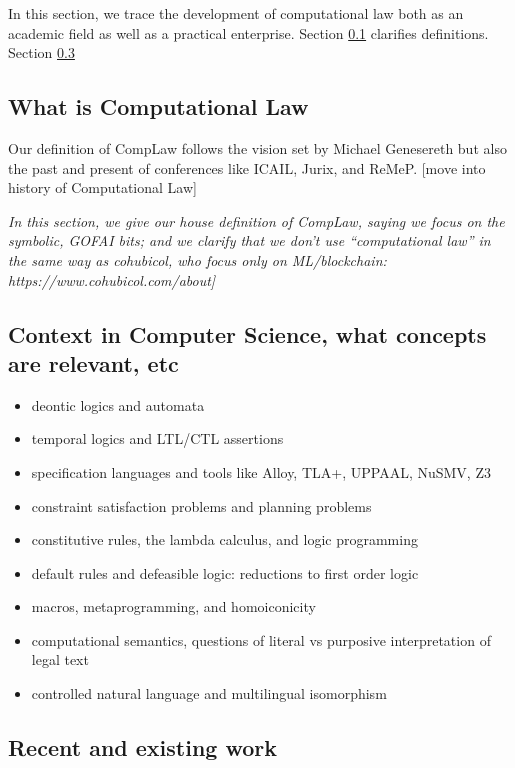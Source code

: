 \documentclass{IOS-Book-Article}
\begin{document}
In this section, we trace the development of computational law both as an academic field as well as a practical enterprise. Section \ref{sec:what_is} clarifies definitions. Section \ref{}
    
\subsection{What is Computational Law}
\label{sec:what_is}

Our definition of CompLaw follows the vision set by Michael Genesereth but also the past and present of conferences like ICAIL, Jurix, and ReMeP. [move into history of Computational Law]

\textit{In this section, we give our house definition of CompLaw, saying we focus on the symbolic, GOFAI bits; and we clarify that we don't use ``computational law'' in the same way as cohubicol, who focus only on ML/blockchain: https://www.cohubicol.com/about]}

\subsection{Context in Computer Science, what concepts are relevant, etc}

\begin{itemize}
    \item deontic logics and automata
    \item temporal logics and LTL/CTL assertions
    \item specification languages and tools like Alloy, TLA+, UPPAAL, NuSMV, Z3
    \item constraint satisfaction problems and planning problems
    \item constitutive rules, the lambda calculus, and logic programming
    \item default rules and defeasible logic: reductions to first order logic
    \item macros, metaprogramming, and homoiconicity
    \item computational semantics, questions of literal vs purposive interpretation of legal text
    \item controlled natural language and multilingual isomorphism
\end{itemize}

\subsection{Recent and existing work}
\end{document}
